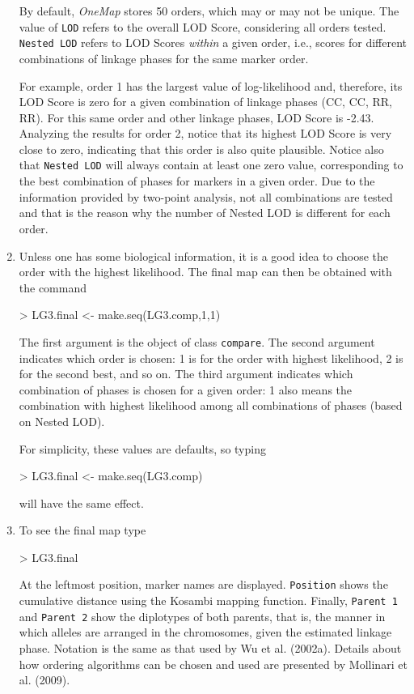 \documentclass[letterpaper,12pt,oneside]{article}
\begin{document}
\begin{enumerate}
By default, {\it OneMap} stores 50 orders, which may or may not be unique. The value of {\tt LOD} refers to the overall LOD Score, considering all orders tested. {\tt Nested LOD} refers to LOD Scores \emph{within} a given order, i.e., scores for different combinations of linkage phases for the same marker order.

For example, order 1 has the largest value of log-likelihood and, therefore, its LOD Score is zero for a given combination of linkage phases (CC, CC, RR, RR). For this same order and other linkage phases, LOD Score is -2.43. Analyzing the results for order 2, notice that its highest LOD Score is very close to zero, indicating that this order is also quite plausible. Notice also that {\tt Nested LOD} will always contain at least one zero value, corresponding to the best combination of phases for markers in a given order. Due to the information provided by two-point analysis, not all combinations are tested and that is the reason why the number of Nested LOD is different for each order.

\item Unless one has some biological information, it is a good idea to choose the order with the highest likelihood. The final map can then be obtained with the command
\begin{Schunk}
\begin{Sinput}
> LG3.final <- make.seq(LG3.comp,1,1)
\end{Sinput}
\end{Schunk}

The first argument is the object of class {\tt compare}. The second argument indicates which order is chosen: 1 is for the order with highest likelihood, 2 is for the second best, and so on. The third argument indicates which combination of phases is chosen for a given order: 1 also means the combination with highest likelihood among all combinations of phases (based on Nested LOD).

For simplicity, these values are defaults, so typing
\begin{Schunk}
\begin{Sinput}
> LG3.final <- make.seq(LG3.comp)
\end{Sinput}
\end{Schunk}
will have the same effect.

\item To see the final map type
\begin{Schunk}
\begin{Sinput}
> LG3.final
\end{Sinput}
\end{Schunk}

At the leftmost position, marker names are displayed. {\tt Position} shows the cumulative distance using the Kosambi mapping function. Finally, {\tt Parent 1} and {\tt Parent 2} show the diplotypes of both parents, that is, the manner in which alleles are arranged in the chromosomes, given the estimated linkage phase. Notation is the same as that used by Wu et al. (2002a). Details about how ordering algorithms can be chosen and used are presented by Mollinari et al. (2009). 
\end{enumerate}
\end{document}
